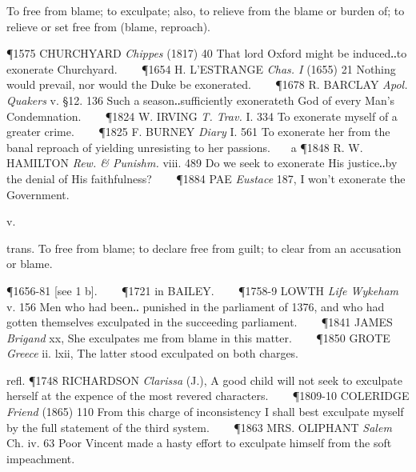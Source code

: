 \begin{description}[wide, labelwidth=!, labelindent=0pt]
\begin{myenumerate}
 To free from blame; to exculpate; also, to relieve from the blame or burden of; to relieve or set free from (blame, reproach).

\P 1575 CHURCHYARD  \textit{Chippes} (1817) 40 That lord Oxford might be induced‥to exonerate Churchyard.    
\P 1654 H. L'ESTRANGE  \textit{Chas. I} (1655) 21 Nothing would prevail, nor would the Duke be exonerated.    
\P 1678 R. BARCLAY  \textit{Apol. Quakers} v. §12. 136 Such a season‥sufficiently exonerateth God of every Man's Condemnation.    
\P 1824 W. IRVING  \textit{T. Trav.} I. 334 To exonerate myself of a greater crime.    
\P 1825 F. BURNEY  \textit{Diary} I. 561 To exonerate her from the banal reproach of yielding unresisting to her passions.    a 
\P 1848 R. W. HAMILTON  \textit{Rew. \& Punishm.} viii. 489 Do we seek to exonerate His justice‥by the denial of His faithfulness?    
\P 1884 PAE  \textit{Eustace} 187, I won't exonerate the Government.
\end{myenumerate}


 v.

\noindent {}

\vspace{-0.3cm}

\begin{myenumerate}

 trans. To free from blame; to declare free from guilt; to clear from an accusation or blame.

\P 1656-81 [see 1 b].    
\P 1721 in  BAILEY.    
\P 1758-9 LOWTH \textit{Life Wykeham} v. 156 Men who had been‥ punished in the parliament of 1376, and who had gotten themselves exculpated in the succeeding parliament.    
\P 1841 JAMES  \textit{Brigand} xx, She exculpates me from blame in this matter.    
\P 1850 GROTE  \textit{Greece} ii. lxii, The latter stood exculpated on both charges.

refl. \P 1748 RICHARDSON  \textit{Clarissa} (J.), A good child will not seek to exculpate herself at the expence of the most revered characters.    
\P 1809-10 COLERIDGE  \textit{Friend} (1865) 110 From this charge of inconsistency I shall best exculpate myself by the full statement of the third system.    
\P 1863 MRS. OLIPHANT  \textit{Salem} Ch. iv. 63 Poor Vincent made a hasty effort to exculpate himself from the soft impeachment.


\end{myenumerate}
\end{description}
